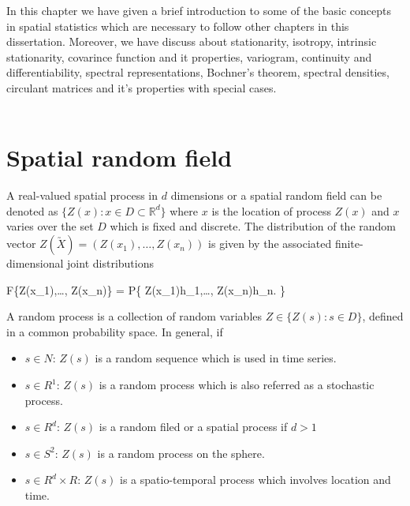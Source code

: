 
In this chapter we have given a brief introduction to some of the basic concepts in spatial statistics which are necessary to follow other chapters in this dissertation. Moreover, we have discuss about stationarity, isotropy, intrinsic stationarity, covarince function and it properties, variogram, continuity and differentiability, spectral representations, Bochner's theorem, spectral densities, circulant matrices and it's properties with special cases.\\~\\


\section{Spatial random field} 

A real-valued spatial process in $d$ dimensions or a spatial random field can be denoted as $\{Z(x): x \in D \subset \mathbb{R}^d\}$ where $x$ is the location of process $Z(x)$ and $x$ varies over the set $D$ which is fixed and discrete. The distribution of the random vector $ Z(\utilde{X})=(Z(x_1),\ldots, Z(x_n) )$ is given by the associated finite-dimensional joint distributions

\beq
F\{Z(x_1),\ldots, Z(x_n)\} = P\{ Z(x_1)\le h_1,\ldots, Z(x_n)\le h_n. \} 
\eeq

A random process is a collection of random variables $Z \in \{Z(s): s\in D\}$, defined in a common probability space. In general, if
\begin{itemize}
	\item $s \in N$: $Z(s)$ is a random sequence which is used in time series.
	\item $s \in R^1$: $Z(s)$ is a random process which is also referred as a stochastic process.
	\item $s \in R^d$: $Z(s)$ is a random filed or a spatial process if $d > 1$
	\item $s \in S^2$: $Z(s)$ is a random process on the sphere.
	\item $s \in R^d\times R$: $Z(s)$ is a spatio-temporal process which involves location and time.
\end{itemize}


